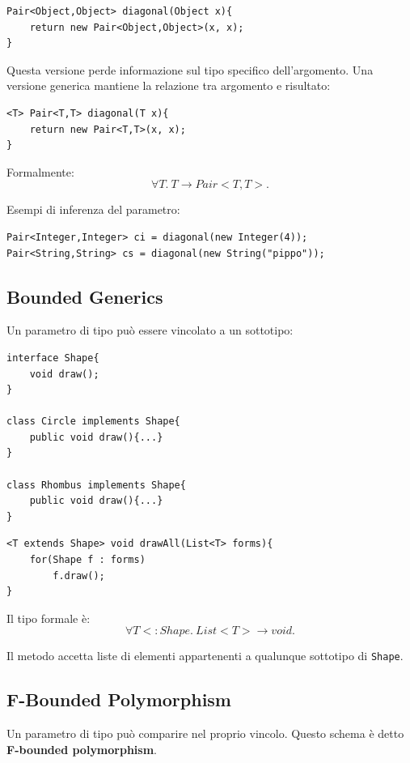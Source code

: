 \documentclass{article}
\begin{document}
\begin{lstlisting}
Pair<Object,Object> diagonal(Object x){
    return new Pair<Object,Object>(x, x);
}
\end{lstlisting}

Questa versione perde informazione sul tipo specifico dell'argomento. Una versione generica mantiene la relazione tra argomento e risultato:

\begin{lstlisting}
<T> Pair<T,T> diagonal(T x){
    return new Pair<T,T>(x, x);
}
\end{lstlisting}

Formalmente:
\[
\forall T.\ T \to Pair<T,T>.
\]

Esempi di inferenza del parametro:

\begin{lstlisting}
Pair<Integer,Integer> ci = diagonal(new Integer(4));
Pair<String,String> cs = diagonal(new String("pippo"));
\end{lstlisting}

\subsection{Bounded Generics}

Un parametro di tipo può essere vincolato a un sottotipo:

\begin{lstlisting}
interface Shape{
    void draw();
}

class Circle implements Shape{
    public void draw(){...}
}

class Rhombus implements Shape{
    public void draw(){...}
}
\end{lstlisting}

\begin{lstlisting}
<T extends Shape> void drawAll(List<T> forms){
    for(Shape f : forms)
        f.draw();
}
\end{lstlisting}

Il tipo formale è:
\[
\forall T <: Shape.\ List<T> \to void.
\]

Il metodo accetta liste di elementi appartenenti a qualunque sottotipo di \texttt{Shape}.

\subsection{F-Bounded Polymorphism}

Un parametro di tipo può comparire nel proprio vincolo. Questo schema è detto \textbf{F-bounded polymorphism}.
\end{document}
